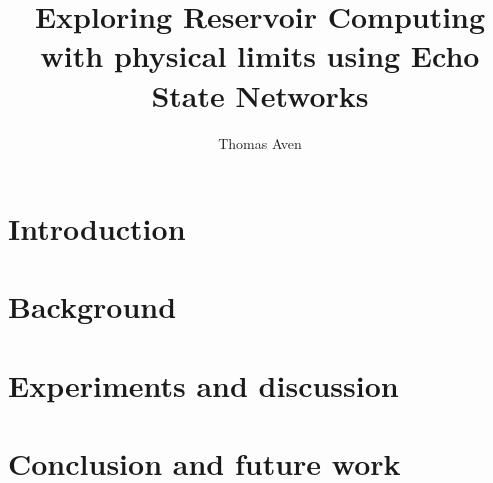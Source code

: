 \documentclass[journal]{IEEEtran}
\begin{document}
\title{Exploring Reservoir Computing with physical limits using Echo State Networks}
\author{Thomas Aven}
\date{}
\maketitle



\section{Introduction}


\section{Background}


\section{Experiments and discussion}


\section{Conclusion and future work}





\end{document}
